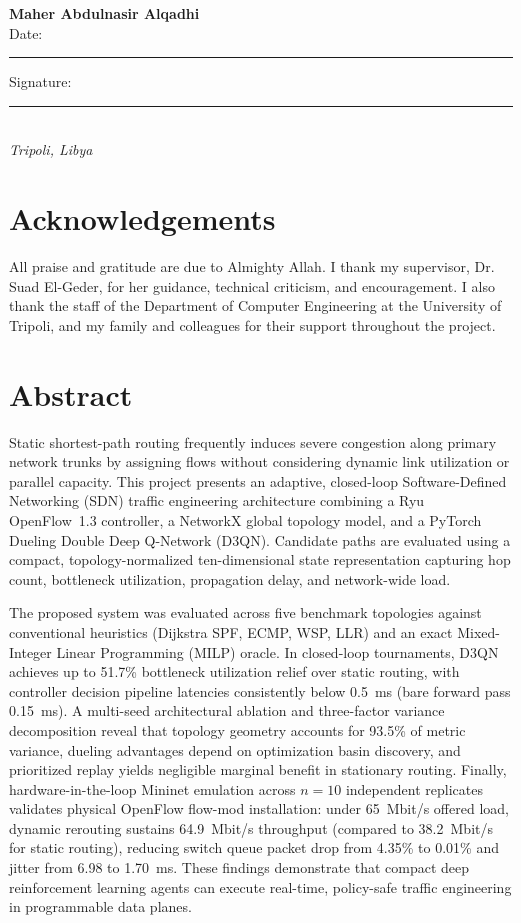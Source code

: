 \documentclass[12pt,a4paper,oneside]{report}
\begin{document}
\vspace{25mm}
\noindent\textbf{Maher Abdulnasir Alqadhi}\\[2mm]
\noindent Date: \rule{45mm}{0.4pt}\hfill Signature: \rule{55mm}{0.4pt}\\[2mm]
\noindent\textit{Tripoli, Libya}

\chapter*{Acknowledgements}
All praise and gratitude are due to Almighty Allah. I thank my supervisor, Dr. Suad El-Geder, for her guidance, technical criticism, and encouragement. I also thank the staff of the Department of Computer Engineering at the University of Tripoli, and my family and colleagues for their support throughout the project.

\chapter*{Abstract}
Static shortest-path routing frequently induces severe congestion along primary network trunks by assigning flows without considering dynamic link utilization or parallel capacity. This project presents an adaptive, closed-loop Software-Defined Networking (SDN) traffic engineering architecture combining a Ryu OpenFlow~1.3 controller, a NetworkX global topology model, and a PyTorch Dueling Double Deep Q-Network (D3QN). Candidate paths are evaluated using a compact, topology-normalized ten-dimensional state representation capturing hop count, bottleneck utilization, propagation delay, and network-wide load.

The proposed system was evaluated across five benchmark topologies against conventional heuristics (Dijkstra SPF, ECMP, WSP, LLR) and an exact Mixed-Integer Linear Programming (MILP) oracle. In closed-loop tournaments, D3QN achieves up to 51.7\% bottleneck utilization relief over static routing, with controller decision pipeline latencies consistently below 0.5~ms (bare forward pass 0.15~ms). A multi-seed architectural ablation and three-factor variance decomposition reveal that topology geometry accounts for 93.5\% of metric variance, dueling advantages depend on optimization basin discovery, and prioritized replay yields negligible marginal benefit in stationary routing. Finally, hardware-in-the-loop Mininet emulation across $n=10$ independent replicates validates physical OpenFlow flow-mod installation: under 65~Mbit/s offered load, dynamic rerouting sustains 64.9~Mbit/s throughput (compared to 38.2~Mbit/s for static routing), reducing switch queue packet drop from 4.35\% to 0.01\% and jitter from 6.98 to 1.70~ms. These findings demonstrate that compact deep reinforcement learning agents can execute real-time, policy-safe traffic engineering in programmable data planes.
\end{document}
